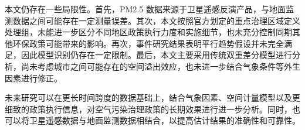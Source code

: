\documentclass[12pt]{article}
\begin{document}
本文仍存在一些局限性。首先，PM2.5 数据来源于卫星遥感反演产品，与地面监测数据之间可能存在一定测量误差。其次，本文按照官方划定的重点治理区域定义处理组，未能进一步区分不同地区政策执行力度和实施细节，也未充分控制同期其他环保政策可能带来的影响。再次，事件研究结果表明平行趋势假设并未完全满足，因此模型识别仍存在一定限制。最后，本文主要采用传统双重差分模型进行分析，尚未考虑城市之间可能存在的空间溢出效应，也未进一步结合气象条件等外生因素进行修正。

未来研究可以在更长时间跨度的数据基础上，结合气象因素、空间计量模型以及更细致的政策执行信息，对空气污染治理政策的长期效果进行进一步分析。同时，也可以将卫星遥感数据与地面监测数据相结合，以提高估计结果的准确性和可靠性。



\end{document}
